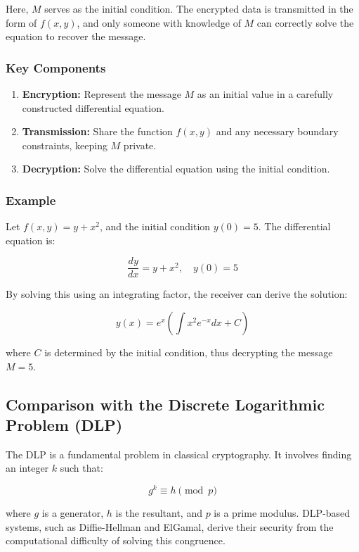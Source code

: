 \documentclass[12pt]{article}
\begin{document}
Here, \( M \) serves as the initial condition. The encrypted data is transmitted in the form of \( f(x, y) \), and only someone with knowledge of \( M \) can correctly solve the equation to recover the message.

\subsubsection*{Key Components}
\begin{enumerate}
    \item \textbf{Encryption:} Represent the message \( M \) as an initial value in a carefully constructed differential equation.
    \item \textbf{Transmission:} Share the function \( f(x, y) \) and any necessary boundary constraints, keeping \( M \) private.
    \item \textbf{Decryption:} Solve the differential equation using the initial condition.
\end{enumerate}

\subsubsection*{Example}

Let \( f(x, y) = y + x^2 \), and the initial condition \( y(0) = 5 \). The differential equation is:

\[
\frac{dy}{dx} = y + x^2, \quad y(0) = 5
\]

By solving this using an integrating factor, the receiver can derive the solution:

\[
y(x) = e^x \left(\int x^2 e^{-x} dx + C\right)
\]

where \( C \) is determined by the initial condition, thus decrypting the message \( M = 5 \).

\subsection*{Comparison with the Discrete Logarithmic Problem (DLP)}

The DLP is a fundamental problem in classical cryptography. It involves finding an integer \( k \) such that:

\[
g^k \equiv h \pmod{p}
\]

where \( g \) is a generator, \( h \) is the resultant, and \( p \) is a prime modulus. DLP-based systems, such as Diffie-Hellman and ElGamal, derive their security from the computational difficulty of solving this congruence.
\end{document}
